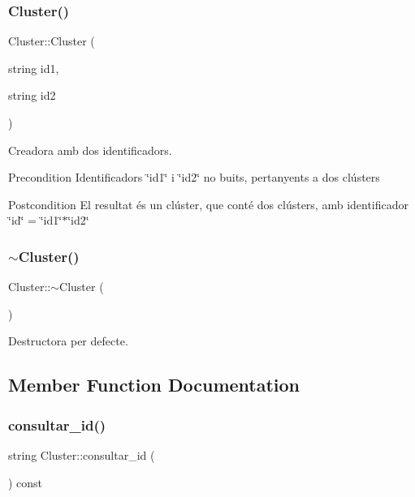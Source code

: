 \subsubsection{\texorpdfstring{Cluster()}{Cluster()}\hspace{0.1cm}{\footnotesize\ttfamily [2/2]}}
{\footnotesize\ttfamily Cluster\+::\+Cluster (\begin{DoxyParamCaption}\item[{string}]{id1,  }\item[{string}]{id2 }\end{DoxyParamCaption})}



Creadora amb dos identificadors. 

\begin{DoxyPrecond}{Precondition}
Identificadors \char`\"{}id1\char`\"{} i \char`\"{}id2\char`\"{} no buits, pertanyents a dos clústers 
\end{DoxyPrecond}
\begin{DoxyPostcond}{Postcondition}
El resultat és un clúster, que conté dos clústers, amb identificador \char`\"{}id\char`\"{} = \char`\"{}id1\char`\"{}$\ast$\char`\"{}id2\char`\"{} 
\end{DoxyPostcond}
\mbox{\label{class_cluster_a4bddfc88ac859610acab15dd12851b58}} 
\subsubsection{\texorpdfstring{$\sim$\+Cluster()}{~Cluster()}}
{\footnotesize\ttfamily Cluster\+::$\sim$\+Cluster (\begin{DoxyParamCaption}{ }\end{DoxyParamCaption})}



Destructora per defecte. 



\subsection{Member Function Documentation}
\mbox{\label{class_cluster_a040da4a393c7fcb8ac7edbe5b82679cf}} 
\subsubsection{\texorpdfstring{consultar\+\_\+id()}{consultar\_id()}}
{\footnotesize\ttfamily string Cluster\+::consultar\+\_\+id (\begin{DoxyParamCaption}{ }\end{DoxyParamCaption}) const}



